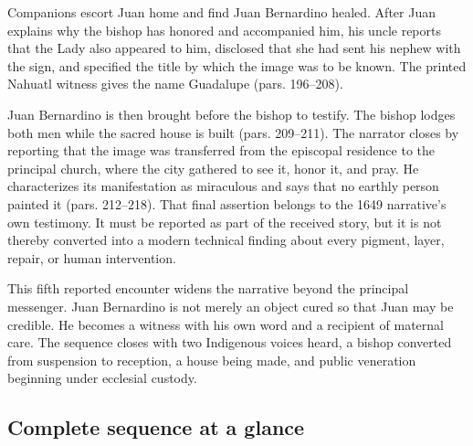 Companions escort Juan home and find Juan Bernardino healed. After Juan explains why the bishop has honored and accompanied him, his uncle reports that the Lady also appeared to him, disclosed that she had sent his nephew with the sign, and specified the title by which the image was to be known. The printed Nahuatl witness gives the name Guadalupe (pars. 196--208).

Juan Bernardino is then brought before the bishop to testify. The bishop lodges both men while the sacred house is built (pars. 209--211). The narrator closes by reporting that the image was transferred from the episcopal residence to the principal church, where the city gathered to see it, honor it, and pray. He characterizes its manifestation as miraculous and says that no earthly person painted it (pars. 212--218). That final assertion belongs to the 1649 narrative's own testimony. It must be reported as part of the received story, but it is not thereby converted into a modern technical finding about every pigment, layer, repair, or human intervention.

This fifth reported encounter widens the narrative beyond the principal messenger. Juan Bernardino is not merely an object cured so that Juan may be credible. He becomes a witness with his own word and a recipient of maternal care. The sequence closes with two Indigenous voices heard, a bishop converted from suspension to reception, a house being made, and public veneration beginning under ecclesial custody.

\subsection{Complete sequence at a glance}

